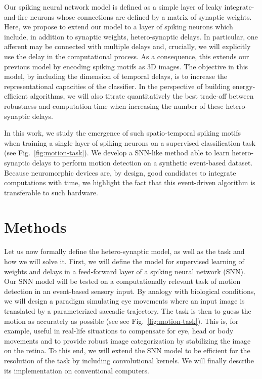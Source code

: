\documentclass[default]{sn-jnl}%
\theoremstyle{thmstyleone}%
\theoremstyle{thmstyletwo}%
\theoremstyle{thmstylethree}%
\newcommand{\seeFig}[1]{see Fig.~\ref{fig:#1}}%
\begin{document}
Our spiking neural network model is defined as a simple layer of leaky integrate-and-fire neurons whose connections are defined by a matrix of synaptic weights. Here, we propose to extend our model to a layer of spiking neurons which include, in addition to synaptic weights, hetero-synaptic delays. In particular, one afferent may be connected with multiple delays and, crucially, we will explicitly use the delay in the computational process. As a consequence, this extends our previous model by encoding spiking motifs as 3D images. The objective in this model, by including the dimension of temporal delays, is to increase the representational capacities of the classifier. In the perspective of building energy-efficient algorithms, we will also titrate quantitatively the best trade-off between robustness and computation time when increasing the number of these hetero-synaptic delays. %

In this work, we study the emergence of such spatio-temporal spiking motifs when training a single layer of spiking neurons on a supervised classification task (\seeFig{motion-task}). We develop a SNN-like method able to learn hetero-synaptic delays to perform motion detection on a synthetic event-based dataset. Because neuromorphic devices are, by design, good candidates to integrate computations with time, we highlight the fact that this event-driven algorithm is transferable to such hardware.
%
\section{Methods}
\label{sec:methods}
Let us now formally define the hetero-synaptic model, as well as the task and how we will solve it. First, we will define the model for supervised learning of weights and delays in a feed-forward layer of a spiking neural network (SNN). Our SNN model will be tested on a computationally relevant task of motion detection in an event-based sensory input. By analogy with biological conditions, we will design a paradigm simulating eye movements where an input image is translated by a parameterized saccadic trajectory. The task is then to guess the motion as accurately as possible (see \seeFig{motion-task}). This is, for example, useful in real-life situations to compensate for eye, head or body movements and to provide robust image categorization by stabilizing the image on the retina. To this end, we will extend the SNN model to be efficient for the resolution of the task by including convolutional kernels. We will finally describe its implementation on conventional computers. 
%
\end{document}
